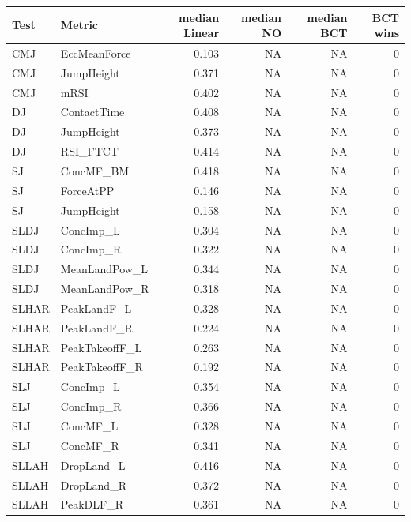 \begin{tabular}{llrrrr}
\toprule
Test & Metric & median Linear & median NO & median BCT & BCT wins \\
\midrule
CMJ & EccMeanForce & 0.103 & NA & NA & 0 \\
CMJ & JumpHeight & 0.371 & NA & NA & 0 \\
CMJ & mRSI & 0.402 & NA & NA & 0 \\
DJ & ContactTime & 0.408 & NA & NA & 0 \\
DJ & JumpHeight & 0.373 & NA & NA & 0 \\
DJ & RSI\_FTCT & 0.414 & NA & NA & 0 \\
SJ & ConcMF\_BM & 0.418 & NA & NA & 0 \\
SJ & ForceAtPP & 0.146 & NA & NA & 0 \\
SJ & JumpHeight & 0.158 & NA & NA & 0 \\
SLDJ & ConcImp\_L & 0.304 & NA & NA & 0 \\
SLDJ & ConcImp\_R & 0.322 & NA & NA & 0 \\
SLDJ & MeanLandPow\_L & 0.344 & NA & NA & 0 \\
SLDJ & MeanLandPow\_R & 0.318 & NA & NA & 0 \\
SLHAR & PeakLandF\_L & 0.328 & NA & NA & 0 \\
SLHAR & PeakLandF\_R & 0.224 & NA & NA & 0 \\
SLHAR & PeakTakeoffF\_L & 0.263 & NA & NA & 0 \\
SLHAR & PeakTakeoffF\_R & 0.192 & NA & NA & 0 \\
SLJ & ConcImp\_L & 0.354 & NA & NA & 0 \\
SLJ & ConcImp\_R & 0.366 & NA & NA & 0 \\
SLJ & ConcMF\_L & 0.328 & NA & NA & 0 \\
SLJ & ConcMF\_R & 0.341 & NA & NA & 0 \\
SLLAH & DropLand\_L & 0.416 & NA & NA & 0 \\
SLLAH & DropLand\_R & 0.372 & NA & NA & 0 \\
SLLAH & PeakDLF\_R & 0.361 & NA & NA & 0 \\
\bottomrule
\end{tabular}
